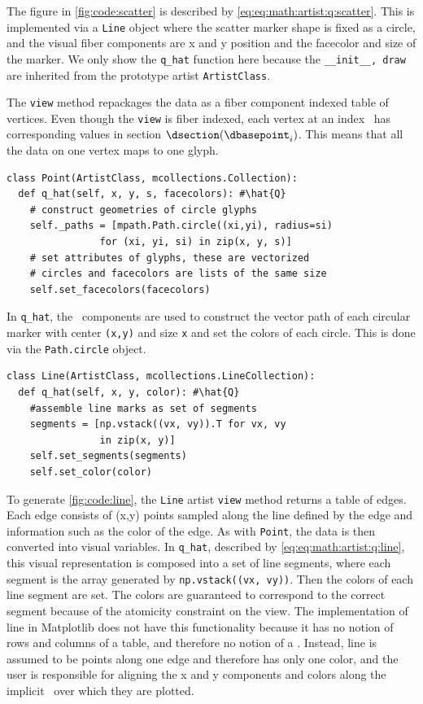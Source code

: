 \documentclass[../main.tex]{subfiles}
\begin{document}
The figure in \autoref{fig:code:scatter} is described by \autoref{eq:eq:math:artist:q:scatter}. This is implemented via a \texttt{Line} object where the scatter marker shape is fixed as a circle, and the visual fiber components are x and y position and the facecolor and size of the marker. We only show the \texttt{q_hat} function here because the \texttt{__init__, draw} are inherited from the prototype artist \texttt{ArtistClass}. 

The \texttt{view} method repackages the data as a fiber component indexed table of vertices. Even though the \texttt{view} is fiber indexed, each vertex at an index \dbasepoint\ has corresponding values in section $\dsection(\dbasepoint_{i})$. This means that all the data on one vertex maps to one glyph.
\begin{verbatim}
class Point(ArtistClass, mcollections.Collection):
  def q_hat(self, x, y, s, facecolors): #\hat{Q}
    # construct geometries of circle glyphs
    self._paths = [mpath.Path.circle((xi,yi), radius=si) 
                for (xi, yi, si) in zip(x, y, s)] 
    # set attributes of glyphs, these are vectorized 
    # circles and facecolors are lists of the same size
    self.set_facecolors(facecolors)
\end{verbatim} 
In \texttt{q_hat}, the \vsection\ components are used to construct the vector path of each circular marker with center \texttt{(x,y)} and size \texttt{x} and set the colors of each circle. This is done via the \texttt{Path.circle} object. 
\begin{verbatim}
class Line(ArtistClass, mcollections.LineCollection):
  def q_hat(self, x, y, color): #\hat{Q}
    #assemble line marks as set of segments 
    segments = [np.vstack((vx, vy)).T for vx, vy 
                in zip(x, y)]
    self.set_segments(segments)
    self.set_color(color)
\end{verbatim}
To generate \autoref{fig:code:line}, the \texttt{Line} artist \texttt{view} method returns a table of edges. Each edge consists of (x,y) points sampled along the line defined by the edge and information such as the color of the edge. As with \texttt{Point}, the data is then converted into visual variables. In \texttt{q_hat}, described by \autoref{eq:eq:math:artist:q:line}, this visual representation is composed into a set of line segments, where each segment is the array generated by \texttt{np.vstack((vx, vy))}. Then the colors of each line segment are set. The colors are guaranteed to correspond to the correct segment because of the atomicity constraint on the view. The implementation of line in Matplotlib does not have this functionality because it has no notion of rows and columns of a table, and therefore no notion of a \dsection. Instead, line is assumed to be points along one edge and therefore has only one color, and the user is responsible for aligning the x and y components and colors along the implicit \dbase\ over which they are plotted. 
\end{document}
